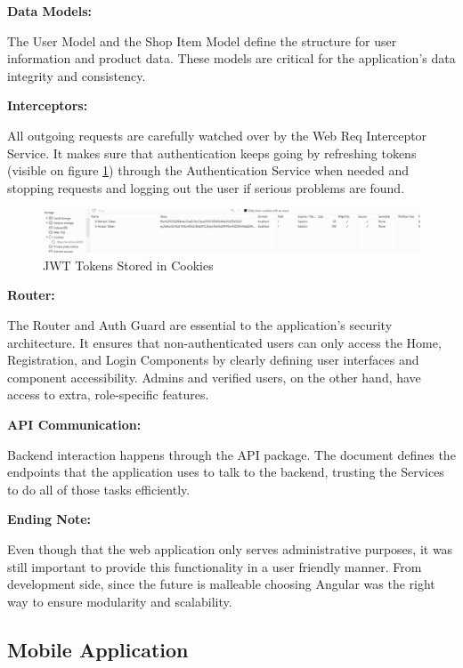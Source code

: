 \noindent\textbf{Data Models:} 

The User Model and the Shop Item Model define the structure for user information and product data. These models are critical for the application's data integrity and consistency.

\noindent\textbf{Interceptors:} 

All outgoing requests are carefully watched over by the Web Req Interceptor Service. It makes sure that authentication keeps going by refreshing tokens (visible on figure \ref{fig:cookies}) through the Authentication Service when needed and stopping requests and logging out the user if serious problems are found.

\begin{figure}[H]
	\centering
	\includegraphics[width=1\linewidth]{img/cookies_ss.png}
	\caption{JWT Tokens Stored in Cookies}
	\label{fig:cookies}
\end{figure}


\noindent\textbf{Router:} 

The Router and Auth Guard are essential to the application's security architecture. It ensures that non-authenticated users can only access the Home, Registration, and Login Components by clearly defining user interfaces and component accessibility. Admins and verified users, on the other hand, have access to extra, role-specific features.

\noindent\textbf{API Communication:}

Backend interaction happens through the API package. The document defines the endpoints that the application uses to talk to the backend, trusting the Services to do all of those tasks efficiently.

\noindent\textbf{Ending Note:}

Even though that the web application only serves administrative purposes, it was still important to provide this functionality in a user friendly manner. From development side, since the future is malleable choosing Angular was the right way to ensure modularity and scalability. 

\newpage

\subsection{Mobile Application}

